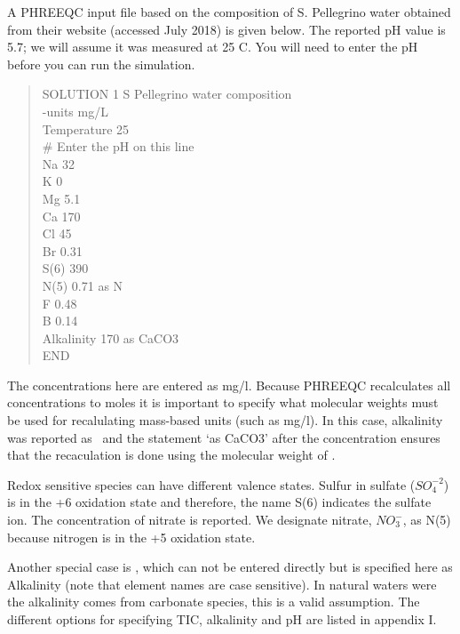 A PHREEQC input file based on the composition of S. Pellegrino water obtained from their 
website (accessed July 2018) is given below.  
The reported pH value is 5.7; we will assume it was measured at 25 C.  
You will need to enter the pH before you can run the simulation.

\begin{quote}
SOLUTION 1  S Pellegrino water composition \\
-units mg/L \\
Temperature	25 \\
\# Enter the pH on this line \\
Na	32 \\
K	0 \\
Mg	5.1 \\
Ca	170 \\
Cl	45 \\
Br	0.31 \\
S(6)	390 \\
N(5)	0.71 as N	 \\
F	0.48 \\
B	0.14 \\
Alkalinity	170  as CaCO3 \\
END \\
\end{quote}


The concentrations here are entered as mg/l. Because PHREEQC recalculates all concentrations to moles it is important to specify what molecular weights must be used for recalulating mass-based units (such as mg/l). In this case, alkalinity was reported as \cc\ and the statement `as CaCO3' after the concentration ensures that the recaculation is done using the molecular weight of \cc. 

Redox sensitive species can have different valence states. Sulfur
in sulfate ($SO_4^{-2}$) is in the +6 oxidation state and therefore, the name
S(6) indicates the sulfate ion. The concentration of nitrate is reported.  
We designate nitrate, $NO_3^{-}$, as N(5) because nitrogen is in the +5 oxidation state.  


Another special case is \bi, which can not be entered directly but is specified here as Alkalinity (note that element names are case sensitive). In natural waters were the alkalinity comes from carbonate species, this is a valid assumption. The different options for specifying TIC, alkalinity and pH are listed in appendix I.

